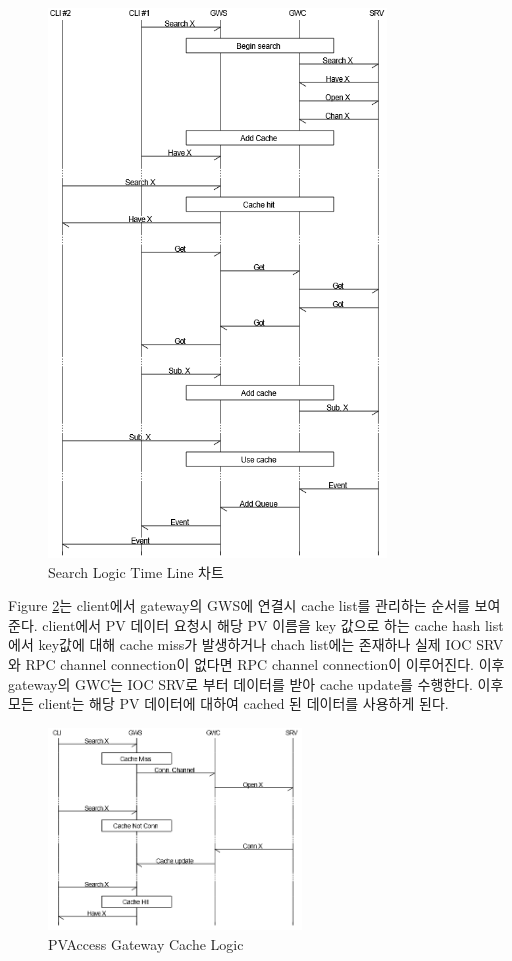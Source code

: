 \documentclass[11pt
  , a4paper
  , article
  , oneside
]{memoir}
\begin{document}
\begin{figure}[!htb]
	\centering
	\includegraphics[width=0.8\textwidth, height=0.7\textheight]{./images/search.png}
	\caption{
		Search Logic Time Line 차트
	}
	\label{fig:search}   
\end{figure}

\clearpage

Figure \ref{fig:cached}는 client에서 gateway의 GWS에 연결시 cache list를 관리하는 순서를 보여준다. client에서 PV 데이터 요청시 해당 PV 이름을 key 값으로 하는 cache hash list에서 key값에 대해 cache miss가 발생하거나 chach list에는 존재하나 실제 IOC SRV와 RPC channel connection이 없다면 RPC channel connection이 이루어진다. 이후 gateway의 GWC는 IOC SRV로 부터 데이터를 받아 cache update를 수행한다. 이후 모든 client는 해당 PV 데이터에 대하여 cached 된 데이터를 사용하게 된다.

\begin{figure}[!htb]
	\centering
	\includegraphics[width=0.6\textwidth, height=0.4\textheight]{./images/cached.png}
	\caption{
		PVAccess Gateway Cache Logic
	}
	\label{fig:cached}   
\end{figure}
\end{document}
